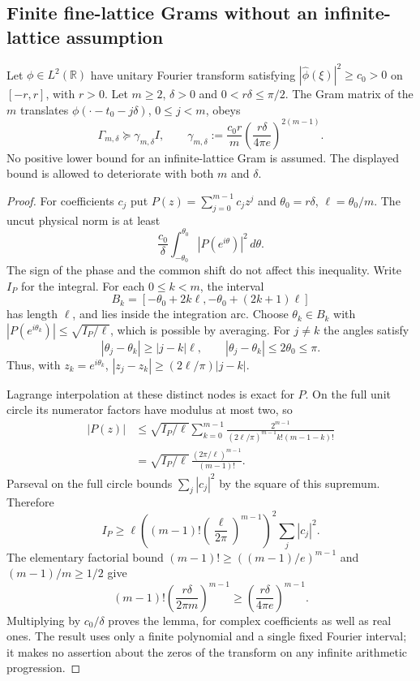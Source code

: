 \subsection*{Finite fine-lattice Grams without an infinite-lattice assumption}

\begin{lemma}
\label{lem:ns46-finite-arc}
Let $\phi\in L^2(\mathbb R)$ have unitary Fourier transform satisfying
$|\widehat\phi(\xi)|^2\ge c_0>0$ on $[-r,r]$, with $r>0$.
Let $m\ge2$, $\delta>0$ and $0<r\delta\le\pi/2$.
The Gram matrix of the $m$ translates
$\phi(\cdot-t_0-j\delta)$, $0\le j<m$, obeys
\begin{equation}\label{eq:ns46-gram-bound}
 \Gamma_{m,\delta}\succeq\gamma_{m,\delta}I,
 \qquad
 \gamma_{m,\delta}:=\frac{c_0r}{m}
       \left(\frac{r\delta}{4\pi e}\right)^{2(m-1)}.
\end{equation}
No positive lower bound for an infinite-lattice Gram is assumed.
The displayed bound is allowed to deteriorate with both $m$ and $\delta$.
\end{lemma}
\begin{proof}
For coefficients $c_j$ put $P(z)=\sum_{j=0}^{m-1}c_jz^j$ and
$\theta_0=r\delta$, $\ell=\theta_0/m$. The uncut physical norm is at least
\[
 \frac{c_0}{\delta}\int_{-\theta_0}^{\theta_0}
                      |P(e^{i\theta})|^2\,d\theta.
\]
The sign of the phase and the common shift do not affect this inequality.
Write $I_P$ for the integral. For each $0\le k<m$, the interval
\[
 B_k=[-\theta_0+2k\ell,-\theta_0+(2k+1)\ell]
\]
has length $\ell$, and lies inside the integration arc. Choose
$\theta_k\in B_k$ with
$|P(e^{i\theta_k})|\le\sqrt{I_P/\ell}$, which is possible by averaging.
For $j\ne k$ the angles satisfy
\[
 |\theta_j-\theta_k|\ge |j-k|\ell,
 \qquad |\theta_j-\theta_k|\le2\theta_0\le\pi.
\]
Thus, with $z_k=e^{i\theta_k}$,
$|z_j-z_k|\ge(2\ell/\pi)|j-k|$.

Lagrange interpolation at these distinct nodes is exact for $P$.
On the full unit circle its numerator factors have modulus at most two,
so
\begin{align*}
 |P(z)|
 &\le\sqrt{I_P/\ell}
   \sum_{k=0}^{m-1}
   \frac{2^{m-1}}{(2\ell/\pi)^{m-1}k!(m-1-k)!}\\
 &=\sqrt{I_P/\ell}\,
   \frac{(2\pi/\ell)^{m-1}}{(m-1)!}.
\end{align*}
Parseval on the full circle bounds $\sum_j|c_j|^2$ by the square
of this supremum. Therefore
\[
 I_P\ge\ell
 \left((m-1)!\left(\frac{\ell}{2\pi}\right)^{m-1}\right)^2
 \sum_j|c_j|^2.
\]
The elementary factorial bound
$(m-1)!\ge((m-1)/e)^{m-1}$ and $(m-1)/m\ge1/2$ give
\[
 (m-1)!\left(\frac{r\delta}{2\pi m}\right)^{m-1}
 \ge\left(\frac{r\delta}{4\pi e}\right)^{m-1}.
\]
Multiplying by $c_0/\delta$ proves the lemma, for complex coefficients
as well as real ones. The result uses only a finite polynomial and a
single fixed Fourier interval; it makes no assertion about the zeros
of the transform on any infinite arithmetic progression.
\end{proof}

